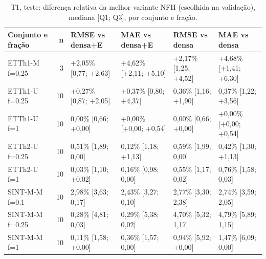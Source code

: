 \begin{table}[htbp]
\centering
\scriptsize
\setlength{\tabcolsep}{2pt}
\caption{T1, teste: diferen\c{c}a relativa da melhor variante NFH (escolhida na valida\c{c}\~ao), mediana [Q1; Q3], por conjunto e fração.}\label{tab:t1_cj_test}
\begin{tabular}{lrllll}
\toprule
\shortstack[l]{Conjunto e\\ fração} & n & \shortstack[l]{RMSE vs\\ densa+E} & \shortstack[l]{MAE vs\\ densa+E} & \shortstack[l]{RMSE vs\\ densa} & \shortstack[l]{MAE vs\\ densa} \\ \midrule
ETTh1-M f=0.25 & 3 & +2,05\% [\textminus{}0,77; +2,63] & +4,62\% [+2,11; +5,10] & +2,17\% [\textminus{}1,25; +4,52] & +4,68\% [+1,41; +6,30] \\
ETTh1-U f=0.25 & 10 & +0,27\% [\textminus{}0,87; +2,05] & +0,37\% [\textminus{}0,80; +4,37] & \textminus{}0,36\% [\textminus{}1,16; +1,90] & \textminus{}0,37\% [\textminus{}1,22; +3,56] \\
ETTh1-U f=1 & 10 & \textminus{}0,00\% [\textminus{}0,66; +0,00] & +0,00\% [+0,00; +0,54] & \textminus{}0,00\% [\textminus{}0,66; +0,00] & +0,00\% [+0,00; +0,54] \\
ETTh2-U f=0.25 & 10 & \textminus{}0,51\% [\textminus{}1,89; \textminus{}0,00] & \textminus{}0,12\% [\textminus{}1,18; +1,13] & \textminus{}0,59\% [\textminus{}1,99; \textminus{}0,00] & \textminus{}0,42\% [\textminus{}1,30; +1,13] \\
ETTh2-U f=1 & 10 & \textminus{}0,03\% [\textminus{}1,10; +0,02] & \textminus{}0,16\% [\textminus{}0,98; \textminus{}0,00] & \textminus{}0,55\% [\textminus{}1,17; \textminus{}0,02] & \textminus{}0,76\% [\textminus{}1,58; \textminus{}0,03] \\
SINT-M-M f=0.1 & 10 & \textminus{}2,98\% [\textminus{}3,63; \textminus{}0,17] & \textminus{}2,43\% [\textminus{}3,27; \textminus{}0,10] & \textminus{}2,77\% [\textminus{}3,30; \textminus{}2,38] & \textminus{}2,74\% [\textminus{}3,59; \textminus{}2,05] \\
SINT-M-M f=0.25 & 10 & \textminus{}0,28\% [\textminus{}4,81; \textminus{}0,03] & \textminus{}0,29\% [\textminus{}5,38; \textminus{}0,02] & \textminus{}4,70\% [\textminus{}5,32; \textminus{}1,17] & \textminus{}4,79\% [\textminus{}5,89; \textminus{}1,15] \\
SINT-M-M f=1 & 10 & \textminus{}0,11\% [\textminus{}1,58; +0,00] & \textminus{}0,36\% [\textminus{}1,57; \textminus{}0,00] & \textminus{}0,94\% [\textminus{}5,92; +0,00] & \textminus{}1,47\% [\textminus{}6,09; \textminus{}0,00] \\

\end{tabular}
\end{table}
